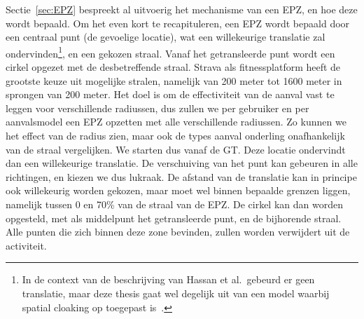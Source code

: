 Sectie~\ref{sec:EPZ} bespreekt al uitvoerig het mechanisme van een \ac{EPZ}, en
hoe deze wordt bepaald. Om het even kort te recapituleren, een \ac{EPZ} wordt
bepaald door een centraal punt (de gevoelige locatie), wat een willekeurige
translatie zal ondervinden\footnote{In de context van de beschrijving van
    Hassan et al.\ gebeurd er geen translatie, maar deze thesis gaat wel degelijk
    uit van een model waarbij spatial cloaking op toegepast
    is~\cite{sec18has3:online}.}, en een gekozen straal. Vanaf het getransleerde
punt wordt een cirkel opgezet met de desbetreffende straal. Strava als
fitnessplatform heeft de grootste keuze uit mogelijke stralen, namelijk van 200
meter tot 1600 meter in sprongen van 200 meter. Het doel is om de effectiviteit
van de aanval vast te leggen voor verschillende radiussen, dus zullen we per
gebruiker en per aanvalsmodel een \ac{EPZ} opzetten met alle verschillende
radiussen. Zo kunnen we het effect van de radius zien, maar ook de types aanval
onderling onafhankelijk van de straal vergelijken. We starten dus vanaf de
\ac{GT}. Deze locatie ondervindt dan een willekeurige translatie. De
verschuiving van het punt kan gebeuren in alle richtingen, en kiezen we dus
lukraak. De afstand van de translatie kan in principe ook willekeurig worden
gekozen, maar moet wel binnen bepaalde grenzen liggen, namelijk tussen 0 en
70\% van de straal van de \ac{EPZ}. De cirkel kan dan worden opgesteld, met als
middelpunt het getransleerde punt, en de bijhorende straal. Alle punten die
zich binnen deze zone bevinden, zullen worden verwijdert uit de activiteit.

